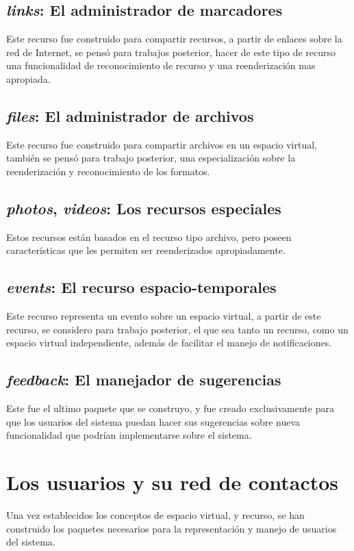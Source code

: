 \subsection{\emph{links}: El administrador de marcadores}
Este recurso fue construido para compartir recursos, a partir de enlaces sobre
la red de Internet, se pensó para trabajos posterior, hacer de este tipo de
recurso una funcionalidad de reconocimiento de recurso y una reenderización mas
apropiada.

\subsection{\emph{files}: El administrador de archivos}
Este recurso fue construido para compartir archivos en un espacio virtual,
también se pensó para trabajo posterior, una especialización sobre la
reenderización y reconocimiento de los formatos.

\subsection{\emph{photos}, \emph{videos}: Los recursos especiales}
Estos recursos están basados en el recurso tipo archivo, pero poseen
características que les permiten ser reenderizados apropiadamente.

\subsection{\emph{events}: El recurso espacio-temporales}
Este recurso representa un evento sobre un espacio virtual, a partir de este
recurso, se considero para trabajo posterior, el que sea tanto un recurso, como
un espacio virtual independiente, además de facilitar el manejo de
notificaciones.

\subsection{\emph{feedback}: El manejador de sugerencias}
Este fue el ultimo paquete que se construyo, y fue creado exclusivamente para
que los usuarios del sistema puedan hacer sus sugerencias sobre nueva
funcionalidad que podrían implementarse sobre el sistema.

\section{Los usuarios y su red de contactos}
Una vez establecidos los conceptos de espacio virtual, y recurso, se han
construido los paquetes necesarios para la representación y manejo de usuarios
del sistema.

